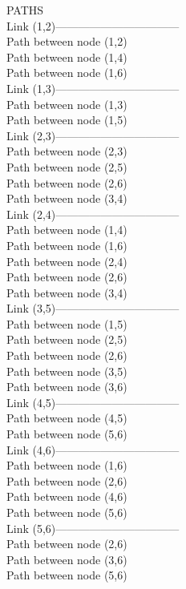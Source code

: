 PATHS\\
Link (1,2)---------------------------------\\
Path between node (1,2)\\
Path between node (1,4)\\
Path between node (1,6)\\
Link (1,3)---------------------------------\\
Path between node (1,3)\\
Path between node (1,5)\\
Link (2,3)---------------------------------\\
Path between node (2,3)\\
Path between node (2,5)\\
Path between node (2,6)\\
Path between node (3,4)\\
Link (2,4)---------------------------------\\
Path between node (1,4)\\
Path between node (1,6)\\
Path between node (2,4)\\
Path between node (2,6)\\
Path between node (3,4)\\
Link (3,5)---------------------------------\\
Path between node (1,5)\\
Path between node (2,5)\\
Path between node (2,6)\\
Path between node (3,5)\\
Path between node (3,6)\\
Link (4,5)---------------------------------\\
Path between node (4,5)\\
Path between node (5,6)\\
Link (4,6)---------------------------------\\
Path between node (1,6)\\
Path between node (2,6)\\
Path between node (4,6)\\
Path between node (5,6)\\
Link (5,6)---------------------------------\\
Path between node (2,6)\\
Path between node (3,6)\\
Path between node (5,6)\\



